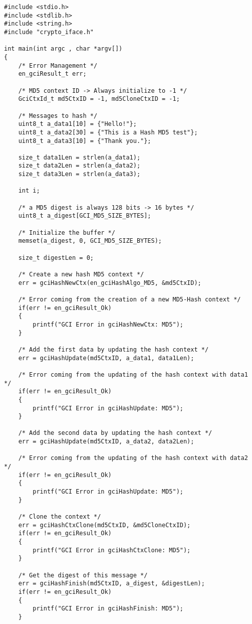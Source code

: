 \begin{lstlisting}
#include <stdio.h>
#include <stdlib.h>
#include <string.h>
#include "crypto_iface.h"

int main(int argc , char *argv[])
{
    /* Error Management */
    en_gciResult_t err;

    /* MD5 context ID -> Always initialize to -1 */
    GciCtxId_t md5CtxID = -1, md5CloneCtxID = -1;

    /* Messages to hash */
    uint8_t a_data1[10] = {"Hello!"};
    uint8_t a_data2[30] = {"This is a Hash MD5 test"};
    uint8_t a_data3[10] = {"Thank you."};

    size_t data1Len = strlen(a_data1);
    size_t data2Len = strlen(a_data2);
    size_t data3Len = strlen(a_data3);

    int i;

    /* a MD5 digest is always 128 bits -> 16 bytes */
    uint8_t a_digest[GCI_MD5_SIZE_BYTES];

    /* Initialize the buffer */
    memset(a_digest, 0, GCI_MD5_SIZE_BYTES);

    size_t digestLen = 0;

    /* Create a new hash MD5 context */
    err = gciHashNewCtx(en_gciHashAlgo_MD5, &md5CtxID);

    /* Error coming from the creation of a new MD5-Hash context */
    if(err != en_gciResult_Ok)
    {
        printf("GCI Error in gciHashNewCtx: MD5");
    }

    /* Add the first data by updating the hash context */
    err = gciHashUpdate(md5CtxID, a_data1, data1Len);

    /* Error coming from the updating of the hash context with data1 */
    if(err != en_gciResult_Ok)
    {
        printf("GCI Error in gciHashUpdate: MD5");
    }

    /* Add the second data by updating the hash context */
    err = gciHashUpdate(md5CtxID, a_data2, data2Len);

    /* Error coming from the updating of the hash context with data2 */
    if(err != en_gciResult_Ok)
    {
        printf("GCI Error in gciHashUpdate: MD5");
    }

    /* Clone the context */
    err = gciHashCtxClone(md5CtxID, &md5CloneCtxID);
    if(err != en_gciResult_Ok)
    {
        printf("GCI Error in gciHashCtxClone: MD5");
    }

    /* Get the digest of this message */
    err = gciHashFinish(md5CtxID, a_digest, &digestLen);
    if(err != en_gciResult_Ok)
    {
        printf("GCI Error in gciHashFinish: MD5");
    }


\end{lstlisting}
